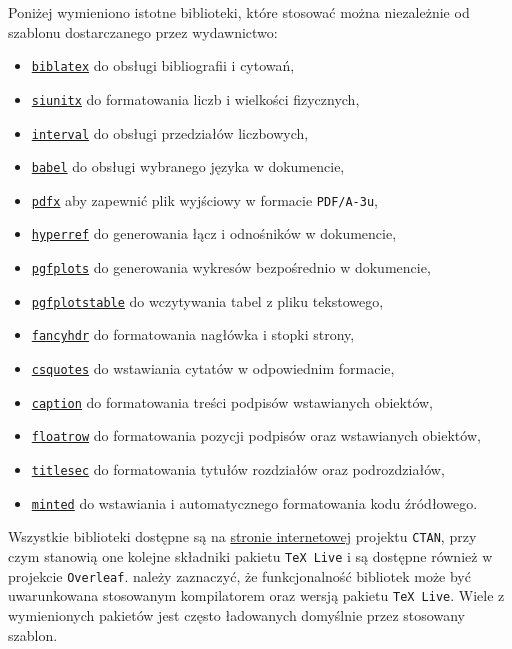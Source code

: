 Poniżej wymieniono istotne biblioteki, które stosować można niezależnie od szablonu dostarczanego przez wydawnictwo:
\begin{itemize}
\item \texttt{\href{https://ctan.org/pkg/biblatex}{biblatex}} do obsługi bibliografii i cytowań,
\item \texttt{\href{https://ctan.org/pkg/siunitx}{siunitx}} do formatowania liczb i wielkości fizycznych,
\item \texttt{\href{https://ctan.org/pkg/interval}{interval}} do obsługi przedziałów liczbowych,
\item \texttt{\href{https://ctan.org/pkg/babel-polish}{babel}} do obsługi wybranego języka w dokumencie,
\item \texttt{\href{https://ctan.org/pkg/pdfx}{pdfx}} aby zapewnić plik wyjściowy w formacie \texttt{PDF/A-3u},
\item \texttt{\href{https://ctan.org/pkg/hyperref}{hyperref}} do generowania łącz i odnośników w dokumencie,
\item \texttt{\href{https://ctan.org/pkg/pgfplots}{pgfplots}} do generowania wykresów bezpośrednio w dokumencie,
\item \texttt{\href{https://ctan.org/pkg/pgfplots}{pgfplotstable}} do wczytywania tabel z pliku tekstowego,
\item \texttt{\href{https://ctan.org/pkg/fancyhdr}{fancyhdr}} do formatowania nagłówka i stopki strony,
\item \texttt{\href{https://ctan.org/pkg/csquotes}{csquotes}} do wstawiania cytatów w odpowiednim formacie,
\item \texttt{\href{https://ctan.org/pkg/caption}{caption}} do formatowania treści podpisów wstawianych obiektów,
\item \texttt{\href{https://ctan.org/pkg/floatrow}{floatrow}} do formatowania pozycji podpisów oraz wstawianych obiektów,
\item \texttt{\href{https://ctan.org/pkg/titlesec}{titlesec}} do formatowania tytułów rozdziałów oraz podrozdziałów,
\item \texttt{\href{https://ctan.org/pkg/minted}{minted}} do wstawiania i automatycznego formatowania kodu źródłowego.
\end{itemize}

Wszystkie biblioteki dostępne są na \href{https://ctan.org/}{stronie internetowej} projektu \texttt{CTAN}, przy czym stanowią one kolejne składniki pakietu \texttt{TeX Live} i są dostępne również w projekcie \texttt{Overleaf}. należy zaznaczyć, że funkcjonalność bibliotek może być uwarunkowana stosowanym kompilatorem oraz wersją pakietu \texttt{TeX Live}. Wiele z wymienionych pakietów jest często ładowanych domyślnie przez stosowany szablon.
